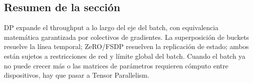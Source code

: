 \subsection{Resumen de la sección}

DP expande el throughput a lo largo del eje del batch, con equivalencia matemática garantizada por colectivos de gradientes. La superposición de buckets resuelve la línea temporal; ZeRO/FSDP resuelven la replicación de estado; ambos están sujetos a restricciones de red y límite global del batch. Cuando el batch ya no puede crecer más o las matrices de parámetros requieren cómputo entre dispositivos, hay que pasar a Tensor Parallelism.


